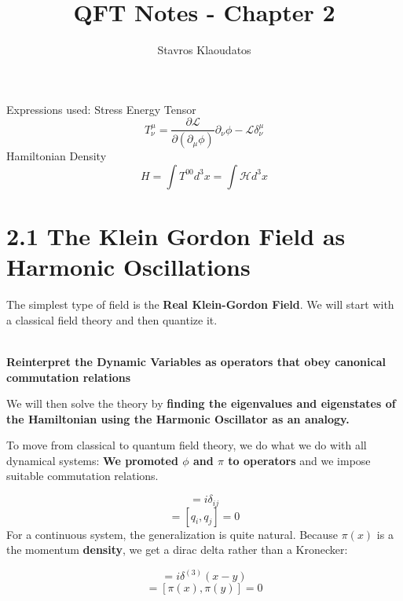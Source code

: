 \documentclass{article}
\title{QFT Notes - Chapter 2}
\author{Stavros Klaoudatos}
\date{ }
\newcommand{\bb}[1]{\begin{tcolorbox}
  \textbf{#1}
\end{tcolorbox}}
\begin{document}
\maketitle
\tableofcontents
\listoffigures

Expressions used:
Stress Energy Tensor
\begin{equation*}
    T^\mu_\nu = \frac{\partial \mathcal{L}}{\partial(\partial_\mu \phi)}\partial_\nu \phi - \mathcal{L}\delta^\mu_\nu
\end{equation*}
Hamiltonian Density
\begin{equation*}
    H = \int T^{00} d^3x = \int \mathcal{H}d^3 x
\end{equation*}

\section{2.1 The Klein Gordon Field as Harmonic Oscillations}

The simplest type of field is the \textbf{Real Klein-Gordon Field}. We will start with a classical field theory and then quantize it. 
\bb{
\\
Reinterpret the Dynamic Variables as operators that obey canonical commutation relations}

We will then solve the theory by \textbf{finding the eigenvalues and eigenstates of the Hamiltonian using the Harmonic Oscillator as an analogy.}

To move from classical to quantum field theory, we do what we do with all dynamical systems: \textbf{We promoted $\phi$ and $\pi$ to operators} and we impose suitable commutation relations.

\begin{equation}
    [q_i,p_j] = i \delta_{ij}
\end{equation}
\begin{equation}
    [p_i,p_j] = [q_i,q_j]=0
\end{equation}
 For a continuous system, the generalization is quite natural. Because $\pi(x)$ is a the momentum \textbf{density}, we get a dirac delta rather than a Kronecker:
 
 \begin{equation}
     [\phi(x),\pi(y)] = i\delta^{(3)}(x-y)
 \end{equation}
 \begin{equation}
     [\phi(x),\phi(y)] = [\pi(x),\pi(y)] = 0
 \end{equation}
 
\end{document}
